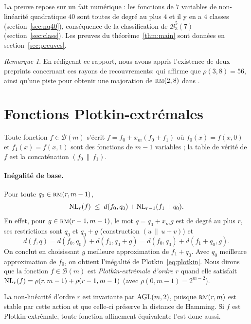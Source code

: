 \documentclass[11pt,a4paper]{article}
\newcommand{\dist}{d}
\def\bst(#1,#2,#3){\mathcal{B}_{#1}^{#2}(#3)}
\def\NL(#1,#2){ {\rm NL}_{#1}(#2) }
\def\AGL(#1,#2){ {\rm AGL}(#1,#2) }
\def\rmc(#1,#2){ \textsc {rm}(#1,#2) }
\def\boole(#1){\mathcal{B}(#1)}
\theoremstyle{plain}
\theoremstyle{definition}
\theoremstyle{remark}
\newtheorem{remark}[theorem]{Remarque}
\begin{document}
La preuve repose sur un fait numérique : les fonctions de $7$ variables de
non-linéarité quadratique $40$ sont toutes de degré au plus $4$ et il y en a
$4$ classes (section~\ref{sec:nq40}), conséquence de la classification de
$\bst(3,5,7)$ (section~\ref{sec:class}). Les preuves du
théorème~\ref{thm:main} sont données en section~\ref{sec:preuves}.

\begin{remark}
En rédigeant ce rapport, nous avons appris  
l'existence de deux preprints concernant ces rayons 
de recouvrements: \cite{RM38} qui affirme que
$\rho(3,8) = 56$, ainsi qu'une piste pour
obtenir une majoration de $\rmc(2,8)$ dans
\cite{RM28}.
\end{remark}
\section{Fonctions Plotkin-extrémales}\label{sec:extremal}

Toute fonction $f\in\boole(m)$ s'écrit $f=f_0+x_m(f_0+f_1)$ où
$f_0(x)=f(x,0)$ et $f_1(x)=f(x,1)$ sont des fonctions de $m-1$ variables ;
la table de vérité de $f$ est la concaténation $(f_0\,\|\,f_1)$.

\paragraph{Inégalité de base.}
Pour toute $q_0\in\rmc(r,m-1)$,
\begin{equation}\label{eq:base}
\NL(r,f)\;\le\;\dist(f_0,q_0)+\NL(r-1,f_1+q_0).
\end{equation}
En effet, pour $g\in\rmc(r-1,m-1)$, le mot $q=q_0+x_m g$ est de degré au plus
$r$, ses restrictions sont $q_0$ et $q_0+g$ (construction $(u\,\|\,u+v)$) et
$$
\dist(f,q)=\dist(f_0,q_0)+\dist(f_1,q_0+g)=\dist(f_0,q_0)+\dist(f_1+q_0,g).
$$
On conclut en choisissant $g$ meilleure approximation de $f_1+q_0$. Avec
$q_0$ meilleure approximation de $f_0$, on obtient l'inégalité de
Plotkin~\eqref{eq:plotkin}.  Nous dirons que la fonction $f\in\boole(m)$
est \emph{Plotkin-extrémale d'ordre $r$} quand elle
satisfait $\NL(r,f)=\rho(r,m-1)+\rho(r-1,m-1)$ (avec $\rho(0,m-1)=2^{m-2}$).

La non-linéarité d'ordre $r$ est invariante par $\AGL(m,2)$, puisque
$\rmc(r,m)$ est stable par cette action et que celle-ci préserve la distance de
Hamming. Si $f$ est Plotkin-extrémale, toute fonction affinement équivalente
l'est donc aussi.
\end{document}
